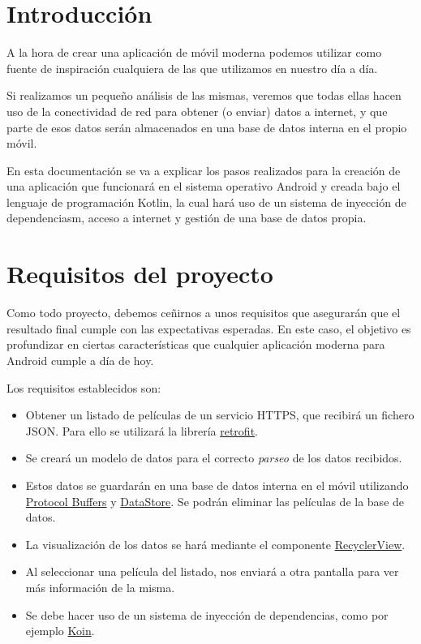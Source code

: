 \documentclass{\ClassPath/viu-tfm-template}
\begin{document}
    \graphicspath{{../../VIU_TFM_LaTeX_template/}}

    \coverpage

    \tableofcontents

\chapter{Introducción}

A la hora de crear una aplicación de móvil moderna podemos utilizar como fuente de inspiración cualquiera de las que utilizamos en nuestro día a día.

Si realizamos un pequeño análisis de las mismas, veremos que todas ellas hacen uso de la conectividad de red para obtener (o enviar) datos a internet, y que parte de esos datos serán almacenados en una base de datos interna en el propio móvil.

En esta documentación se va a explicar los pasos realizados para la creación de una aplicación que funcionará en el sistema operativo Android y creada bajo el lenguaje de programación Kotlin, la cual hará uso de un sistema de inyección de dependenciasm, acceso a internet y gestión de una base de datos propia.


\chapter{Requisitos del proyecto}

Como todo proyecto, debemos ceñirnos a unos requisitos que asegurarán que el resultado final cumple con las expectativas esperadas. En este caso, el objetivo es profundizar en ciertas características que cualquier aplicación moderna para Android cumple a día de hoy.

Los requisitos establecidos son:

\begin{itemize}
    \item Obtener un listado de películas de un servicio HTTPS, que recibirá un fichero JSON. Para ello se utilizará la librería \href{https://github.com/square/retrofit}{retrofit}.
    \item Se creará un modelo de datos para el correcto \textit{parseo} de los datos recibidos.
    \item Estos datos se guardarán en una base de datos interna en el móvil utilizando \href{https://developers.google.com/protocol-buffers}{Protocol Buffers} y \href{https://developer.android.com/topic/libraries/architecture/datastore}{DataStore}. Se podrán eliminar las películas de la base de datos.
    \item La visualización de los datos se hará mediante el componente \href{https://developer.android.com/develop/ui/views/layout/recyclerview}{RecyclerView}.
    \item Al seleccionar una película del listado, nos enviará a otra pantalla para ver más información de la misma.
    \item Se debe hacer uso de un sistema de inyección de dependencias, como por ejemplo \href{https://insert-koin.io/}{Koin}.
\end{itemize}
\end{document}
